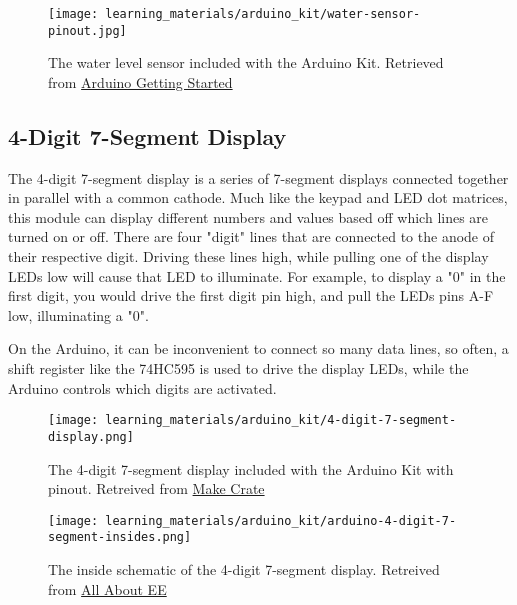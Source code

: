     \begin{figure}[h!]
        \texttt{[image: learning\_materials/arduino\_kit/water-sensor-pinout.jpg]}
        \caption[Water Level Sensor]{The water level sensor included with the Arduino Kit. 
        Retrieved from \href{https://arduinogetstarted.com/images/tutorial/water-sensor-pinout.jpg}
        {Arduino Getting Started}}
    \end{figure}

    \subsection*{4-Digit 7-Segment Display}
    The 4-digit 7-segment display is a series of 7-segment displays connected together in parallel with a common cathode.
    Much like the keypad and LED dot matrices, this module can display different numbers and values based off which lines are turned on or off.
    There are four "digit" lines that are connected to the anode of their respective digit.
    Driving these lines high, while pulling one of the display LEDs low will cause that LED to illuminate.
    For example, to display a "0" in the first digit, you would drive the first digit pin high, and pull the LEDs pins A-F low, illuminating a "0".

    On the Arduino, it can be inconvenient to connect so many data lines, so often, a shift register like the 74HC595 is used to drive the display LEDs, while the Arduino controls which digits are activated.

    \begin{figure}[h!]
        \texttt{[image: learning\_materials/arduino\_kit/4-digit-7-segment-display.png]}
        \caption[4-Digit 7-Segment]{The 4-digit 7-segment display included with the Arduino Kit with pinout. 
        Retreived from \href{https://i.ytimg.com/vi/fYAlE1u5rno/maxresdefault.jpg}
        {Make Crate}}
    \end{figure}

    \begin{figure*}[b]
        \texttt{[image: learning\_materials/arduino\_kit/arduino-4-digit-7-segment-insides.png]}
        \caption[4-Digit 7-Segment Schematic]{The inside schematic of the 4-digit 7-segment display. 
        Retreived from \href{https://lh6.googleusercontent.com/-UVNbhMgaoc4/Thh-bH7d5zI/AAAAAAAAAEQ/FphoqjmYsVg/s800/arduino-4-digit-7-segment-insides.png}
        {All About EE}}
    \end{figure*}
